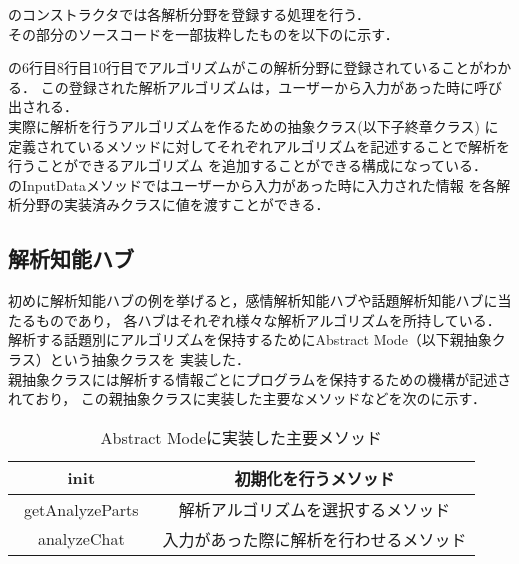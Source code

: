 のコンストラクタでは各解析分野を登録する処理を行う．\\
その部分のソースコードを一部抜粋したものを以下のに示す．


の6行目8行目10行目でアルゴリズムがこの解析分野に登録されていることがわかる．
この登録された解析アルゴリズムは，ユーザーから入力があった時に呼び出される．
\\
実際に解析を行うアルゴリズムを作るための抽象クラス(以下子終章クラス)
に定義されているメソッドに対してそれぞれアルゴリズムを記述することで解析を行うことができるアルゴリズム
を追加することができる構成になっている．
\\

のInputDataメソッドではユーザーから入力があった時に入力された情報
を各解析分野の実装済みクラスに値を渡すことができる．\\


\subsection{解析知能ハブ}
初めに解析知能ハブの例を挙げると，感情解析知能ハブや話題解析知能ハブに当たるものであり，
各ハブはそれぞれ様々な解析アルゴリズムを所持している．\\

解析する話題別にアルゴリズムを保持するためにAbstract Mode（以下親抽象クラス）という抽象クラスを
実装した．\\

親抽象クラスには解析する情報ごとにプログラムを保持するための機構が記述されており，
この親抽象クラスに実装した主要なメソッドなどを次のに示す．

\begin{table}[tbh]
	\caption{Abstract Modeに実装した主要メソッド} \label{tab:Abstract Mode}
	\begin{center}
		\begin{tabular}[htb]{c|c}
		\hline
		init & 初期化を行うメソッド \\ \hline
		getAnalyzeParts　& 解析アルゴリズムを選択するメソッド \\ \hline
		analyzeChat & 入力があった際に解析を行わせるメソッド \\ \hline
		\end{tabular}
	\end{center}
\end{table}


